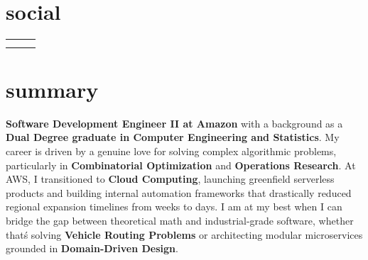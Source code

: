 \documentclass{friggeri-cv}
\newcommand{\myhref}[2]{\href[pdfnewwindow=true]{#1}{#2}}
\begin{document}


  \section{social}

    \vspace{-1.5em}
    \begin{center}
      \renewcommand{\arraystretch}{1.5}
      \begin{tabular}{ p{18em} p{19em} p{18em} }
        \myhref{https://garciparedes.me}{\faHome\quad Website: garciparedes.me}
        &
        \myhref{mailto:sergio@garciparedes.me}{\faEnvelope\quad Email: sergio@garciparedes.me}
        &
        \myhref{https://es.linkedin.com/in/garciparedes/en}{\faLinkedin\quad LinkedIn: Sergio García Prado}
        \\

        \myhref{https://github.com/garciparedes}{\faGithub\quad GitHub: @garciparedes}
        &
        \myhref{https://scholar.google.es/citations?user=X3Mb7BAAAAAJ}{\faGraduationCap\quad Scholar: Sergio García Prado}
        &
        \myhref{https://stackoverflow.com/users/3921457/garciparedes}{\faStackOverflow\quad StackOverflow: @garciparedes}
        \\
      \end{tabular}
    \end{center}




  \section{summary}

  \textbf{Software Development Engineer II at Amazon} with a background as a \textbf{Dual Degree graduate in Computer Engineering and Statistics}. My career is driven by a genuine love for solving complex algorithmic problems, particularly in \textbf{Combinatorial Optimization} and \textbf{Operations Research}. At AWS, I transitioned to \textbf{Cloud Computing}, launching greenfield serverless products and building internal automation frameworks that drastically reduced regional expansion timelines from weeks to days. I am at my best when I can bridge the gap between theoretical math and industrial-grade software, whether that\'s solving \textbf{Vehicle Routing Problems} or architecting modular microservices grounded in \textbf{Domain-Driven Design}.
\end{document}
